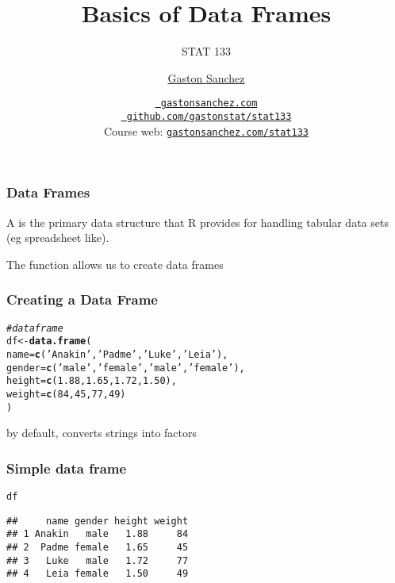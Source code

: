 \documentclass[12pt]{beamer}\usepackage[]{graphicx}\usepackage[]{color}
\title{Basics of Data Frames}
\subtitle{STAT 133}
\author{\href{http://www.gastonsanchez.com}{Gaston Sanchez}}
\institute{Department of Statistics, UC{\textendash}Berkeley}
\date{\href{http://www.gastonsanchez.com}{\tt \scriptsize \color{foreground} gastonsanchez.com}
\\[-4pt]
\href{http://github.com/gastonstat/stat133}{\tt \scriptsize \color{foreground} github.com/gastonstat/stat133}
\\[-4pt]
{\scriptsize Course web: \href{http://www.gastonsanchez.com/stat133}{\tt gastonsanchez.com/stat133}}
}
\makeatletter
\newcommand{\hlnum}[1]{\textcolor[rgb]{0.686,0.059,0.569}{#1}}%
\newcommand{\hlstr}[1]{\textcolor[rgb]{0.192,0.494,0.8}{#1}}%
\newcommand{\hlcom}[1]{\textcolor[rgb]{0.678,0.584,0.686}{\textit{#1}}}%
\newcommand{\hlstd}[1]{\textcolor[rgb]{0.345,0.345,0.345}{#1}}%
\newcommand{\hlkwb}[1]{\textcolor[rgb]{0.69,0.353,0.396}{#1}}%
\newcommand{\hlkwc}[1]{\textcolor[rgb]{0.333,0.667,0.333}{#1}}%
\newcommand{\hlkwd}[1]{\textcolor[rgb]{0.737,0.353,0.396}{\textbf{#1}}}%
\newenvironment{kframe}{%
 \def\at@end@of@kframe{}%
 \ifinner\ifhmode%
  \def\at@end@of@kframe{\end{minipage}}%
  \begin{minipage}{\columnwidth}%
 \fi\fi%
 \def\FrameCommand##1{\hskip\@totalleftmargin \hskip-\fboxsep
 \colorbox{shadecolor}{##1}\hskip-\fboxsep
     \hskip-\linewidth \hskip-\@totalleftmargin \hskip\columnwidth}%
 \MakeFramed {\advance\hsize-\width
   \@totalleftmargin\z@ \linewidth\hsize
   \@setminipage}}%
 {\par\unskip\endMakeFramed%
 \at@end@of@kframe}
\newenvironment{knitrout}{}{} %
\makeatother
\begin{document}
{
  \frame{
    \titlepage
  } 
}


\begin{frame}
\frametitle{Data Frames}

A {\hilit {}} is the primary data structure that R provides for handling tabular data sets (eg spreadsheet like).
\eb

The {\hilit {}} function allows us to create data frames 
\eb

\end{frame}


\begin{frame}[fragile]
\frametitle{Creating a Data Frame}

\begin{knitrout}\footnotesize
{}\color{fgcolor}\begin{kframe}
\begin{alltt}
\hlcom{# data frame}
\hlstd{df} \hlkwb{<-} \hlkwd{data.frame}\hlstd{(}
  \hlkwc{name} \hlstd{=} \hlkwd{c}\hlstd{(}\hlstr{'Anakin'}\hlstd{,} \hlstr{'Padme'}\hlstd{,} \hlstr{'Luke'}\hlstd{,} \hlstr{'Leia'}\hlstd{),}
  \hlkwc{gender} \hlstd{=} \hlkwd{c}\hlstd{(}\hlstr{'male'}\hlstd{,} \hlstr{'female'}\hlstd{,} \hlstr{'male'}\hlstd{,} \hlstr{'female'}\hlstd{),}
  \hlkwc{height} \hlstd{=} \hlkwd{c}\hlstd{(}\hlnum{1.88}\hlstd{,} \hlnum{1.65}\hlstd{,} \hlnum{1.72}\hlstd{,} \hlnum{1.50}\hlstd{),}
  \hlkwc{weight} \hlstd{=} \hlkwd{c}\hlstd{(}\hlnum{84}\hlstd{,} \hlnum{45}\hlstd{,} \hlnum{77}\hlstd{,} \hlnum{49}\hlstd{)}
\hlstd{)}
\end{alltt}
\end{kframe}
\end{knitrout}

by default,  converts strings into factors

\end{frame}


\begin{frame}[fragile]
\frametitle{Simple data frame }

\begin{knitrout}\footnotesize
{}\color{fgcolor}\begin{kframe}
\begin{alltt}
\hlstd{df}
\end{alltt}
\begin{verbatim}
##     name gender height weight
## 1 Anakin   male   1.88     84
## 2  Padme female   1.65     45
## 3   Luke   male   1.72     77
## 4   Leia female   1.50     49
\end{verbatim}
\end{kframe}
\end{knitrout}

\end{frame}
\end{document}
